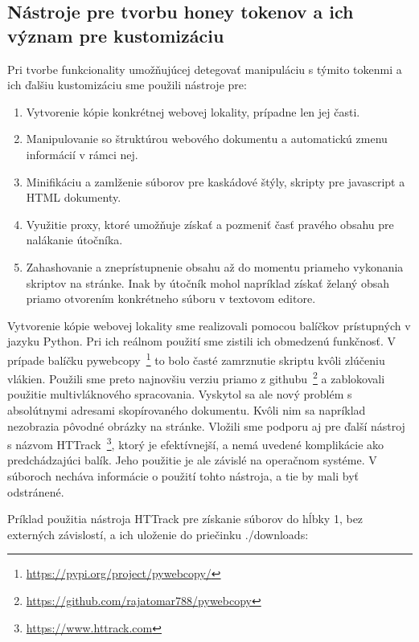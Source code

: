 \documentclass[conference, 11pt,slovak,a4paper,twoside]{IEEEtran}
\begin{document}
\subsection{Nástroje pre tvorbu honey tokenov a ich význam pre kustomizáciu} \label{toolsForConcealingCustomization}

Pri tvorbe funkcionality umožňujúcej detegovať manipuláciu s týmito tokenmi a ich ďalšiu kustomizáciu sme použili nástroje pre:

\begin{enumerate}
	\item Vytvorenie kópie konkrétnej webovej lokality, prípadne len jej časti. 

	\item Manipulovanie so štruktúrou webového dokumentu a automatickú zmenu informácií v rámci nej.
	
	\item Minifikáciu a zamlženie súborov pre kaskádové štýly, skripty pre javascript a HTML dokumenty. 

	\item Využitie proxy, ktoré umožňuje získať a pozmeniť časť pravého obsahu pre nalákanie útočníka.
	
	\item Zahashovanie a zneprístupnenie obsahu až do momentu priameho vykonania skriptov na stránke. Inak by útočník mohol napríklad získať želaný obsah priamo otvorením konkrétneho súboru v textovom editore.
\end{enumerate}

Vytvorenie kópie webovej lokality sme realizovali pomocou balíčkov prístupných v jazyku Python. Pri ich reálnom použití sme zistili ich obmedzenú funkčnosť. V prípade balíčku pywebcopy~\footnote{\url{https://pypi.org/project/pywebcopy/}} to bolo časté zamrznutie skriptu kvôli zlúčeniu vlákien. Použili sme preto najnovšiu verziu priamo z githubu~\footnote{\url{https://github.com/rajatomar788/pywebcopy}} a zablokovali použitie multivláknového spracovania. Vyskytol sa ale nový problém s absolútnymi adresami skopírovaného dokumentu. Kvôli nim sa napríklad nezobrazia pôvodné obrázky na stránke. Vložili sme podporu aj pre ďalší nástroj s názvom HTTrack~\footnote{\url{https://www.httrack.com}}, ktorý je efektívnejší, a nemá uvedené komplikácie ako predchádzajúci balík. Jeho použitie je ale závislé na operačnom systéme. V súboroch necháva informácie o použití tohto nástroja, a tie by mali byť odstránené.

Príklad použitia nástroja HTTrack pre získanie súborov do hĺbky 1, bez externých závislostí, a ich uloženie do priečinku ./downloads:
\end{document}

